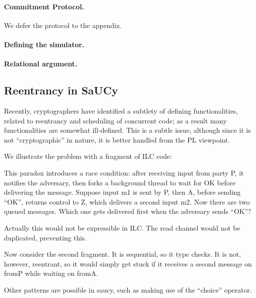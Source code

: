 \paragraph{Commitment Protocol.}
We defer the protocol to the appendix.

\paragraph{Defining the simulator.}

\paragraph{Relational argument.}

\subsection{Reentrancy in SaUCy}
\label{subsec:reentrancy}

Recently, cryptographers have identified a subtlety of defining functionalities,
related to reentrancy and scheduling of concurrent code; as a result many
functionalities are somewhat ill-defined.  This is a subtle issue, although
since it is not ``cryptographic'' in nature, it is better handled from the PL
viewpoint.

We illustrate the problem with a fragment of ILC code:

This paradox introduces a race condition: after receiving input from party P, it
notifies the adversary, then forks a background thread to wait for OK before
delivering the message. Suppose input m1 is sent by P, then A, before sending
“OK”, returns control to Z, which delivers a second input m2. Now there are two
queued messages. Which one gets delivered first when the adversary sends “OK”?

Actually this would not be expressible in ILC. The read channel would not be
duplicated, preventing this.


Now consider the second fragment.  It is sequential, so it type checks. It is
not, however, reentrant, so it would simply get stuck if it receives a second
message on fromP while waiting on fromA.

Other patterns are possible in saucy, such as making use of the ``choice''
operator.
